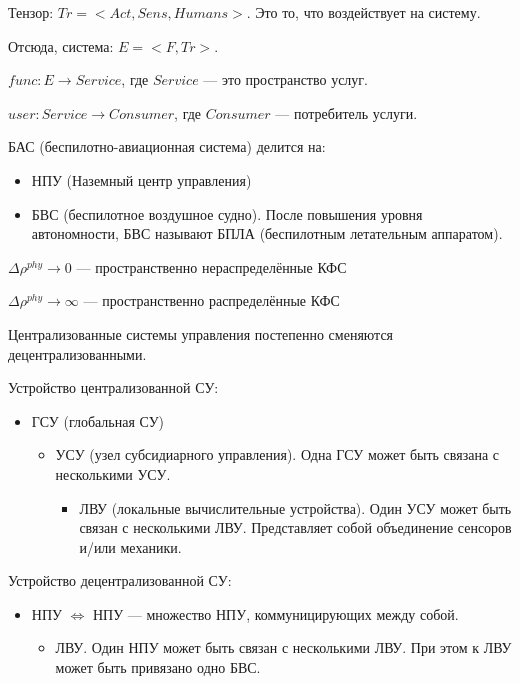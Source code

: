 \documentclass{article}
\begin{document}
\begin{sloppypar}
    Тензор: $Tr = <Act, Sens, Humans>$. Это то, что воздействует на систему.

    Отсюда, система: $E = <F, Tr>$.

    $func: E \rightarrow Service$, где $Service$ — это пространство услуг.

    $user: Service \rightarrow Consumer$, где $Consumer$ — потребитель услуги.

    БАС (беспилотно-авиационная система) делится на:
    \begin{itemize}
        \item НПУ (Наземный центр управления)
        \item БВС (беспилотное воздушное судно). После повышения уровня автономности, БВС называют БПЛА (беспилотным летательным аппаратом).
    \end{itemize}

    $\Delta \rho^{phy} \rightarrow 0$ — пространственно нераспределённые КФС

    $\Delta \rho^{phy} \rightarrow \infty$ — пространственно распределённые КФС

    Централизованные системы управления постепенно сменяются децентрализованными.


    Устройство централизованной СУ:
    \begin{itemize}
        \item ГСУ (глобальная СУ)
              \begin{itemize}
                  \item УСУ (узел субсидиарного управления). Одна ГСУ может быть связана с несколькими УСУ.
                        \begin{itemize}
                            \item ЛВУ (локальные вычислительные устройства). Один УСУ может быть связан с несколькими ЛВУ. Представляет собой объединение сенсоров и/или механики.
                        \end{itemize}
              \end{itemize}
    \end{itemize}

    Устройство децентрализованной СУ:
    \begin{itemize}
        \item НПУ $\Leftrightarrow$ НПУ — множество НПУ, коммуницирующих между собой.
              \begin{itemize}
                  \item ЛВУ. Один НПУ может быть связан с несколькими ЛВУ. При этом к ЛВУ может быть привязано одно БВС.
              \end{itemize}
    \end{itemize}


\end{sloppypar}
\end{document}
